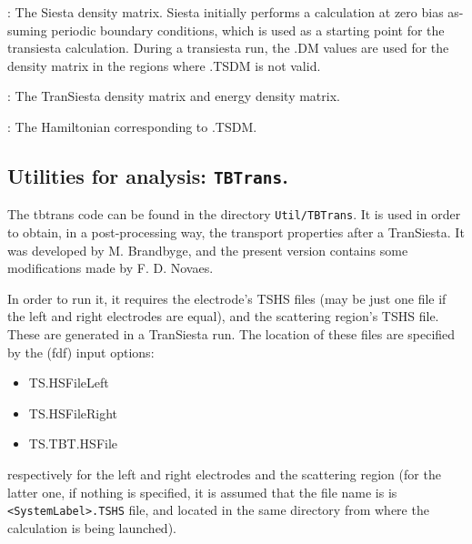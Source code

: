 \documentclass[11pt]{article}
\begin{document}
\begin{description}
    \itemsep 10pt
    \parsep 0pt
    
    \item[{\bf .DM }]: 
        The {\sc Siesta} density matrix. {\sc Siesta} initially performs a calculation 
        at zero bias as-suming periodic boundary conditions, which is used 
        as a starting point for the transiesta calculation. During a transiesta 
        run, the .DM values are used for the density matrix in the regions 
        where .TSDM is not valid.

    \item[{\bf .TSDE }]: 
        The  {\sc TranSiesta} density matrix and energy density matrix.

    \item[{\bf .TSHS }]: 
        The Hamiltonian corresponding to .TSDM.

\end{description} 

\subsection{Utilities for analysis: {\tt TBTrans}.}

The tbtrans code can be found in the directory {\tt Util/TBTrans}. 
It is used in order to obtain, in a post-processing way, the transport properties after 
a {\sc TranSiesta}. It was developed by M. Brandbyge, and the present 
version contains some modifications made by F. D. Novaes.

In order to run it, it requires the electrode's TSHS files (may be just one file if the 
left and right electrodes are equal), and the scattering region's TSHS file. 
These  are generated in a {\sc TranSiesta} run. 
The location of these files are specified by the (fdf) input options:
\begin{itemize}
\item TS.HSFileLeft  
\item TS.HSFileRight
\item TS.TBT.HSFile
\end{itemize}
respectively for the left and right electrodes and the scattering region (for the latter one, 
if nothing is  specified, it is assumed that the file name is is {\tt <SystemLabel>.TSHS} file, 
and located in the same directory from where the calculation is being launched).
\end{document}

